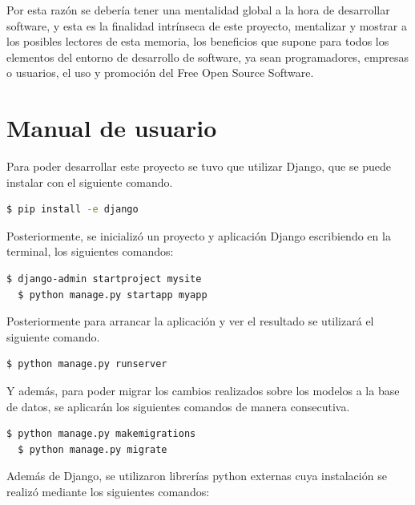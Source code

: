 \documentclass[a4paper, spanish, 12pt]{book}
\begin{document}
Por esta raz\'on se deber\'ia tener una mentalidad global a la hora de desarrollar
software, y esta es la finalidad intr\'inseca de este proyecto, mentalizar y mostrar
a los posibles lectores de esta memoria, los beneficios que supone para todos los
elementos del entorno de desarrollo de software, ya sean programadores, empresas o usuarios,
el uso y promoci\'on del Free Open Source Software.


\cleardoublepage
\appendix
\chapter{Manual de usuario}
\label{app:manual}

Para poder desarrollar este proyecto se tuvo que utilizar Django,
que se puede instalar con el siguiente comando.

\begin{lstlisting}[language=bash]
  $ pip install -e django
\end{lstlisting}

Posteriormente, se inicializ\'o un proyecto y aplicaci\'on Django escribiendo en la
terminal, los siguientes comandos:

\begin{lstlisting}[language=bash]
  $ django-admin startproject mysite
  $ python manage.py startapp myapp
\end{lstlisting}

Posteriormente para arrancar la aplicaci\'on y ver el resultado se utilizar\'a
el siguiente comando.

\begin{lstlisting}[language=bash]
  $ python manage.py runserver
\end{lstlisting}

Y adem\'as, para poder migrar los cambios realizados sobre los modelos a la base
de datos, se aplicar\'an los siguientes comandos de manera consecutiva.

\begin{lstlisting}[language=bash]
  $ python manage.py makemigrations
  $ python manage.py migrate
\end{lstlisting}

Adem\'as de Django, se utilizaron librer\'ias python externas cuya instalaci\'on
se realiz\'o mediante los siguientes comandos:
\end{document}
